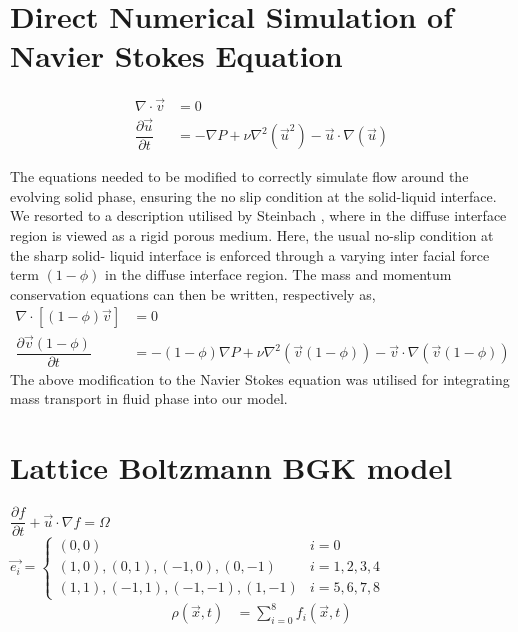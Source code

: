 \documentclass[12pt,a4paper]{report}
\begin{document}
\chapter{Direct Numerical Simulation of Navier Stokes Equation}
	
	\begin{align}
		\nabla\cdot\vec{v} &= 0\\
		\dfrac{\partial \vec{u}}{\partial t} &= - \nabla P + \nu\nabla^2\left(\vec{u}^2\right) - \vec{u}\cdot\nabla\left(\vec{u}\right)
	\end{align}
	
	The equations needed to be modified to correctly simulate flow around the evolving solid phase, ensuring the no slip condition
	at the solid-liquid interface. We resorted to a description utilised by Steinbach \cite{Stein}, where in the diffuse interface 
	region is viewed as a rigid porous medium. Here, the usual no-slip condition at the sharp solid- 
	liquid interface is enforced through a varying inter facial force term $(1-\phi)$ in the diffuse interface 
	region.
	The mass and momentum conservation equations can then be written, respectively as,
	\begin{align}
		\nabla\cdot[(1-\phi)\vec{v}] &= 0\\
		\dfrac{\partial \vec{v}(1-\phi)}{\partial t} &= -(1-\phi)\nabla P + \nu\nabla^2\left(\vec{v}(1-\phi)\right) - \vec{v}\cdot\nabla\left(\vec{v}(1-\phi)\right)
	\end{align}
	The above modification to the Navier Stokes equation was utilised for integrating mass transport in fluid phase into our model.

\chapter{Lattice Boltzmann BGK model}
	
	$
	\dfrac{\partial f}{\partial t} +\vec{u}\cdot \nabla f = \Omega
	$\\
	$
	\vec{e_{i}} = 
	\begin{cases}
		(0,0) & i = 0\\
		(1,0),(0,1),(-1,0),(0,-1) & i = 1,2,3,4\\
		(1,1),(-1,1),(-1,-1),(1,-1) & i = 5,6,7,8
	\end{cases}
	$
	\begin{align}
		\rho(\vec{x},t) &= \sum_{i=0}^{8} f_{i}(\vec{x},t)
	\end{align}

	
	
\end{document}
